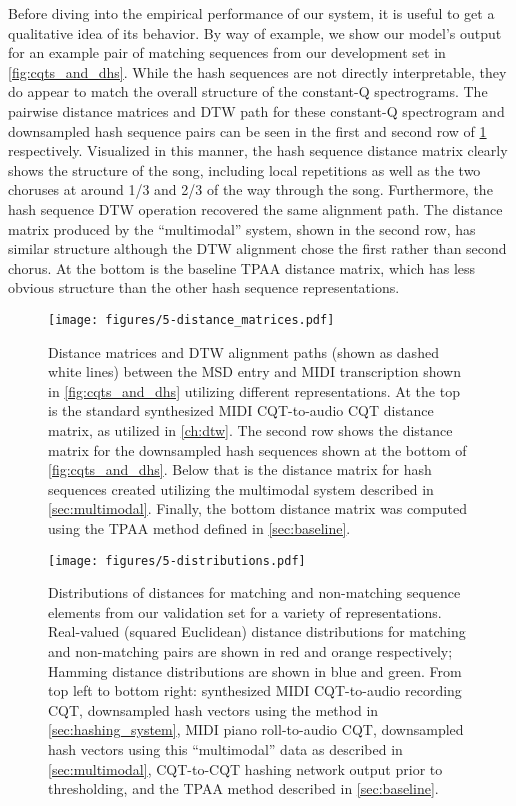 Before diving into the empirical performance of our system, it is useful to get a qualitative idea of its behavior.
By way of example, we show our model's output for an example pair of matching sequences from our development set in \cref{fig:cqts_and_dhs}.
While the hash sequences are not directly interpretable, they do appear to match the overall structure of the constant-Q spectrograms.
The pairwise distance matrices and DTW path for these constant-Q spectrogram and downsampled hash sequence pairs can be seen in the first and second row of \cref{fig:distance_matrices} respectively.
Visualized in this manner, the hash sequence distance matrix clearly shows the structure of the song, including local repetitions as well as the two choruses at around 1/3 and 2/3 of the way through the song.
Furthermore, the hash sequence DTW operation recovered the same alignment path.
The distance matrix produced by the ``multimodal'' system, shown in the second row, has similar structure although the DTW alignment chose the first rather than second chorus.
At the bottom is the baseline TPAA distance matrix, which has less obvious structure than the other hash sequence representations.

\begin{figure}
  \texttt{[image: figures/5-distance\_matrices.pdf]}
  \caption[Distance matrices utilizing different representations]{Distance matrices and DTW alignment paths (shown as dashed white lines) between the MSD entry and MIDI transcription shown in \cref{fig:cqts_and_dhs} utilizing different representations.
At the top is the standard synthesized MIDI CQT-to-audio CQT distance matrix, as utilized in \cref{ch:dtw}.
The second row shows the distance matrix for the downsampled hash sequences shown at the bottom of \cref{fig:cqts_and_dhs}.
Below that is the distance matrix for hash sequences created utilizing the multimodal system described in \cref{sec:multimodal}.
Finally, the bottom distance matrix was computed using the TPAA method defined in \cref{sec:baseline}.}
  \label{fig:distance_matrices}
\end{figure}

\begin{figure}
  \texttt{[image: figures/5-distributions.pdf]}
  \caption[Distributions of matching and non-matching distances]{Distributions of distances for matching and non-matching sequence elements from our validation set for a variety of representations.
Real-valued (squared Euclidean) distance distributions for matching and non-matching pairs are shown in red and orange respectively; Hamming distance distributions are shown in blue and green.
From top left to bottom right: synthesized MIDI CQT-to-audio recording CQT, downsampled hash vectors using the method in \ref{sec:hashing_system}, MIDI piano roll-to-audio CQT, downsampled hash vectors using this ``multimodal'' data as described in \cref{sec:multimodal}, CQT-to-CQT hashing network output prior to thresholding, and the TPAA method described in \cref{sec:baseline}.}
  \label{fig:distributions}
\end{figure}

